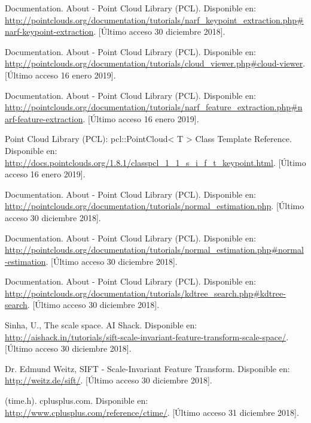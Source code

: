 \begin{thebibliography}{99}
 Documentation. About - Point Cloud Library (PCL). Disponible en: \url{http://pointclouds.org/documentation/tutorials/narf_keypoint_extraction.php#narf-keypoint-extraction}. [Último acceso 30 diciembre 2018].

 Documentation. About - Point Cloud Library (PCL). Disponible en: \url{http://pointclouds.org/documentation/tutorials/cloud_viewer.php#cloud-viewer}. [Último acceso 16 enero 2019].

 Documentation. About - Point Cloud Library (PCL). Disponible en: \url{http://pointclouds.org/documentation/tutorials/narf_feature_extraction.php#narf-feature-extraction}. [Último acceso 16 enero 2019].

 Point Cloud Library (PCL): pcl::PointCloud< T > Class Template Reference. Disponible en: \url{http://docs.pointclouds.org/1.8.1/classpcl_1_1_s_i_f_t_keypoint.html}. [Último acceso 16 enero 2019].


 Documentation. About - Point Cloud Library (PCL). Disponible en: \url{http://pointclouds.org/documentation/tutorials/normal_estimation.php}. [Último acceso 30 diciembre 2018].


 Documentation. About - Point Cloud Library (PCL). Disponible en: \url{
http://pointclouds.org/documentation/tutorials/normal_estimation.php#normal-estimation}. [Último acceso 30 diciembre 2018].


 Documentation. About - Point Cloud Library (PCL). Disponible en: \url{http://pointclouds.org/documentation/tutorials/kdtree_search.php#kdtree-search}. [Último acceso 30 diciembre 2018].


 Sinha, U., The scale space. AI Shack. Disponible en: \url{http://aishack.in/tutorials/sift-scale-invariant-feature-transform-scale-space/}. [Último acceso 30 diciembre 2018].


Dr. Edmund Weitz, SIFT - Scale-Invariant Feature Transform. Disponible en: \url{http://weitz.de/sift/}. [Último acceso 30 diciembre 2018].





(time.h). cplusplus.com. Disponible en: \url{http://www.cplusplus.com/reference/ctime/}. [Último acceso 31 diciembre 2018].




\end{thebibliography}

